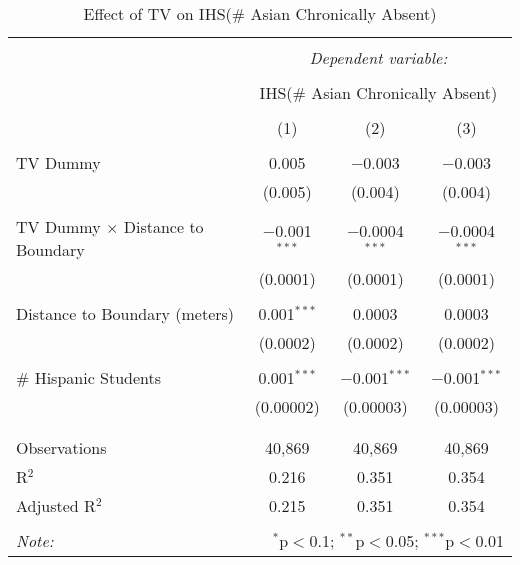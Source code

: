 
\begin{table}[!htbp] \centering 
  \caption{Effect of TV on IHS(\# Asian Chronically Absent)} 
  \label{} 
\begin{tabular}{@{\extracolsep{-2pt}}lccc} 
\\[-1.8ex]\hline 
\hline \\[-1.8ex] 
 & \multicolumn{3}{c}{\textit{Dependent variable:}} \\ 
\cline{2-4} 
\\[-1.8ex] & \multicolumn{3}{c}{IHS(\# Asian Chronically Absent)} \\ 
\\[-1.8ex] & (1) & (2) & (3)\\ 
\hline \\[-1.8ex] 
 TV Dummy & 0.005 & $-$0.003 & $-$0.003 \\ 
  & (0.005) & (0.004) & (0.004) \\ 
  & & & \\ 
 TV Dummy $\times$ Distance to Boundary & $-$0.001$^{***}$ & $-$0.0004$^{***}$ & $-$0.0004$^{***}$ \\ 
  & (0.0001) & (0.0001) & (0.0001) \\ 
  & & & \\ 
 Distance to Boundary (meters) & 0.001$^{***}$ & 0.0003 & 0.0003 \\ 
  & (0.0002) & (0.0002) & (0.0002) \\ 
  & & & \\ 
 \# Hispanic Students & 0.001$^{***}$ & $-$0.001$^{***}$ & $-$0.001$^{***}$ \\ 
  & (0.00002) & (0.00003) & (0.00003) \\ 
  & & & \\ 
\hline \\[-1.8ex] 
Observations & 40,869 & 40,869 & 40,869 \\ 
R$^{2}$ & 0.216 & 0.351 & 0.354 \\ 
Adjusted R$^{2}$ & 0.215 & 0.351 & 0.354 \\ 
\hline 
\hline \\[-1.8ex] 
\textit{Note:}  & \multicolumn{3}{r}{$^{*}$p$<$0.1; $^{**}$p$<$0.05; $^{***}$p$<$0.01} \\ 
\end{tabular} 
\end{table} 
